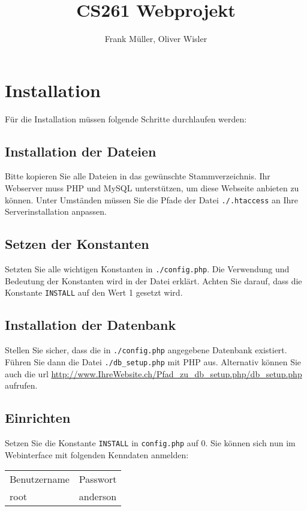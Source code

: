 \documentclass[ngerman, 12pt, pdftex]{scrartcl}[2006/07/30]
\title{CS261 Webprojekt}
\author{Frank Müller, Oliver Wisler}
\begin{document}
\pagestyle{fancy}
\fancyhf{} 
\renewcommand{\headrulewidth}{0.1pt} 	%
\fancyfoot[C]{\thepage} 				%




\tableofcontents
\newpage


\section{Installation}

Für die Installation müssen folgende Schritte durchlaufen werden:
\subsection{Installation der Dateien}
    Bitte kopieren Sie alle Dateien in das gewünschte Stammverzeichnis.
    Ihr Webserver muss PHP und MySQL unterstützen, um diese Webseite anbieten zu können. Unter Umständen müssen Sie die Pfade der Datei \verb+./.htaccess+ an Ihre Serverinstallation anpassen.
\subsection{Setzen der Konstanten}
    Setzten Sie alle wichtigen Konstanten in \verb+./config.php+.
    Die Verwendung und Bedeutung der Konstanten wird in der Datei erklärt.
    Achten Sie darauf, dass die Konstante \verb+INSTALL+ auf den Wert 1 gesetzt wird.
\subsection{Installation der Datenbank} %
\label{sub:Installation der Datenbank}
    Stellen Sie sicher, dass die in  \verb+./config.php+ angegebene Datenbank existiert.
    Führen Sie dann die Datei  \verb+./db_setup.php+ mit PHP aus. Alternativ können Sie auch 
    die url  \url{http://www.IhreWebsite.ch/Pfad_zu_db_setup.php/db_setup.php} aufrufen.
\subsection{Einrichten} %
\label{sub:Einrichten}
    Setzen Sie die Konstante \verb+INSTALL+ in \verb+config.php+ auf 0.
    Sie können sich nun im Webinterface mit folgenden Kenndaten anmelden: \\
    \begin{center}
    \begin{tabular}{ll}
        Benutzername & Passwort \\
        root & anderson \\
    \end{tabular}
    \end{center}
\end{document}
